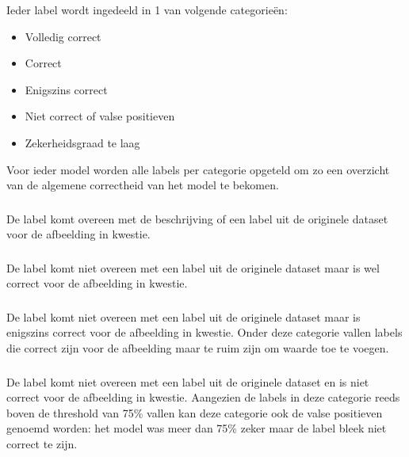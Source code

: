 Ieder label wordt ingedeeld in 1 van volgende categorieën:
 \begin{itemize}
    \item Volledig correct
    \item Correct
    \item Enigszins correct
    \item Niet correct of valse positieven
    \item Zekerheidsgraad te laag
\end{itemize}

Voor ieder model worden alle labels per categorie opgeteld om zo een overzicht van de algemene correctheid van het model te bekomen.

\subsubsection{}
\label{sec:completely-correct}
De label komt overeen met de beschrijving of een label uit de originele dataset voor de afbeelding in kwestie.

\subsubsection{}
\label{sec:correct}
De label komt niet overeen met een label uit de originele dataset maar is wel correct voor de afbeelding in kwestie.

\subsubsection{}
\label{sec:somewhat-correct}
De label komt niet overeen met een label uit de originele dataset maar is enigszins correct voor de afbeelding in kwestie. Onder deze categorie vallen labels die correct zijn voor de afbeelding maar te ruim zijn om waarde toe te voegen.

\subsubsection{}
\label{sec:not-correct}
De label komt niet overeen met een label uit de originele dataset en is niet correct voor de afbeelding in kwestie. Aangezien de labels in deze categorie reeds boven de threshold van 75\% vallen kan deze categorie ook de valse positieven genoemd worden: het model was meer dan 75\% zeker maar de label bleek niet correct te zijn.

